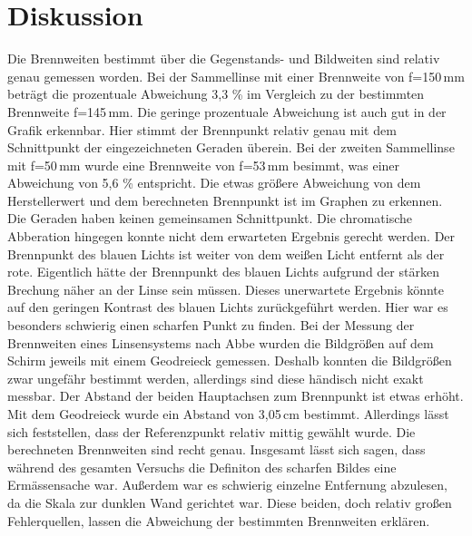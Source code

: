 \section{Diskussion}
Die Brennweiten bestimmt über die Gegenstands- und Bildweiten sind relativ genau gemessen worden.
Bei der Sammellinse mit einer Brennweite von f=150\,mm beträgt die prozentuale Abweichung 3,3 \%
im Vergleich zu der bestimmten Brennweite f=145\,mm. Die geringe prozentuale Abweichung ist auch gut
in der Grafik erkennbar. Hier stimmt der Brennpunkt relativ genau mit dem Schnittpunkt der eingezeichneten Geraden
überein.\newline
Bei der zweiten Sammellinse mit f=50\,mm wurde eine Brennweite von f=53\,mm besimmt, was einer Abweichung von 5,6 \% entspricht.
Die etwas größere Abweichung von dem Herstellerwert und dem berechneten Brennpunkt ist im Graphen zu erkennen.
Die Geraden haben keinen gemeinsamen Schnittpunkt.
\newline
Die chromatische Abberation hingegen konnte nicht dem erwarteten Ergebnis gerecht werden. Der Brennpunkt des blauen Lichts
ist weiter von dem weißen Licht entfernt als der rote. Eigentlich hätte der Brennpunkt des blauen Lichts aufgrund
der stärken Brechung näher an der Linse sein müssen. Dieses unerwartete Ergebnis könnte auf den geringen Kontrast
des blauen Lichts zurückgeführt werden. Hier war es besonders schwierig einen scharfen Punkt zu finden.
\newline
Bei der Messung der Brennweiten eines Linsensystems nach Abbe wurden die Bildgrößen auf dem Schirm jeweils mit einem
Geodreieck gemessen. Deshalb konnten die Bildgrößen zwar ungefähr bestimmt werden, allerdings sind diese händisch nicht exakt
messbar.
\newline
Der Abstand der beiden Hauptachsen zum Brennpunkt ist etwas erhöht. Mit dem Geodreieck wurde ein Abstand von 3,05\,cm bestimmt.
Allerdings lässt sich feststellen, dass der Referenzpunkt relativ mittig gewählt wurde. Die berechneten Brennweiten sind
recht genau.
\newline
Insgesamt lässt sich sagen, dass während des gesamten Versuchs die Definiton des scharfen Bildes eine Ermässensache war.
Außerdem war es schwierig einzelne Entfernung abzulesen, da die Skala zur dunklen Wand gerichtet war. Diese beiden,
doch relativ großen Fehlerquellen, lassen die Abweichung der bestimmten Brennweiten erklären.

